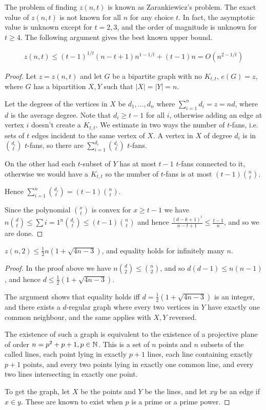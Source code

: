 \documentclass[10pt,a4paper]{article}
\begin{document}
The problem of finding $z(n,t)$ is known as Zarankiewicz's problem. The exact value of $z(n,t)$ is not known for all $n$ for any choice $t$. In fact, the asymptotic value is unknown except for $t = 2,3$, and the order of magnitude is unknown for $t \geq 4$. The following argument gives the best known upper bound.

\begin{theorem}
\begin{align*}
z(n,t) \leq (t-1)^{1/t}(n-t+1)n^{1-1/t} + (t-1)n = O(n^{2-1/t})
\end{align*}
\end{theorem}
\begin{proof}
Let $z = z(n,t)$ and let $G$ be a bipartite graph with no $K_{t,t}$, $e(G) = z$, where $G$ has a bipartition $X,Y$ such that $|X|=|Y|=n$.

Let the degrees of the vertices in $X$ be $d_1, \ldots, d_n$ where $\sum_{i=1}^n d_i = z = nd$, where $d$ is the average degree. Note that $d_i \geq t-1$ for all $i$, otherwise adding an edge at vertex $i$ doesn't create a $K_{t,t}$. We estimate in two ways the number of $t$-fans, i.e. sets of $t$ edges incident to the same vertex of $X$. A vertex in $X$ of degree $d_i$ is in $\binom{d_i}{t}$ $t$-fans, so there are $\sum_{i=1}^{d_i} \binom{d_i}{t}$ $t$-fans.

On the other had each $t$-subset of $Y$ has at most $t-1$ $t$-fans connected to it, otherwise we would have a $K_{t,t}$ so the number of $t$-fans is at most $(t-1)\binom{n}{t}$.

Hence $\sum_{i=1}^n \binom{d_i}{t} = (t-1)\binom{n}{t}$.

Since the polynomial $\binom{x}{t}$ is convex for $x \geq t-1$ we have $n\binom{d}{t} \leq \sum{i=1}^{n} \binom{d_i}{t} \leq (t-1)\binom{n}{t}$ and hence $\frac{(d-k+1)^t}{n-t+1} \leq \frac{t-1}{n}$, and so we are done.
\end{proof}
\begin{theorem}
$z(n,2) \leq \frac{1}{2}n(1+\sqrt{4n-3})$, and equality holds for infinitely many $n$.
\end{theorem}
\begin{proof}
In the proof above we have $n\binom{d}{2} \leq \binom{n}{2}$, and so $d(d-1) \leq n(n-1)$, and hence $d \leq \frac{1}{2}(1+ \sqrt{4n-3})$.

The argument shows that equality holds iff $d =\frac{1}{2}(1+\sqrt{4n-3})$ is an integer, and there exists a $d$-regular graph where every two vertices in $Y$ have exactly one common neighbour, and the same applies with $X, Y$ reversed.

The existence of such a graph is equivalent to the existence of a projective plane of order $n = p^2 + p + 1, p \in \mathbb{N}$. This is a set of $n$ points and $n$ subsets of the called lines, each point lying in exactly $p+1$ lines, each line containing exactly $p+1$ points, and every two points lying in exactly one common line, and every two lines intersecting in exactly one point.

To get the graph, let $X$ be the points and $Y$ be the lines, and let $xy$ be an edge if $x \in y$. These are known to exist when $p$ is a prime or a prime power.
\end{proof}
\end{document}
